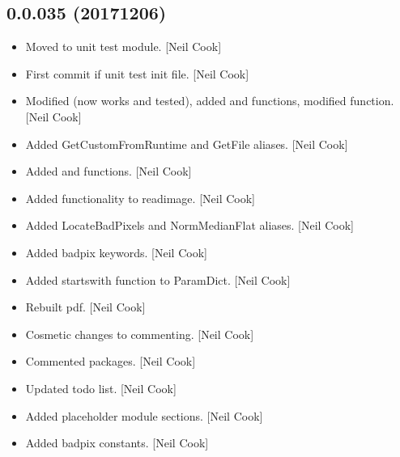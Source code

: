 \documentclass[a4paper,10pt,english]{report}
\begin{document}
\subsection{0.0.035 (2017\sphinxhyphen{}12\sphinxhyphen{}06)}
\label{\detokenize{misc/changelog:id536}}\begin{itemize}
\item {} 
Moved  to unit test module. {[}Neil Cook{]}

\item {} 
First commit if unit test init file. {[}Neil Cook{]}

\item {} 
Modified  (now works and tested), added
 and  functions, modified
 function. {[}Neil Cook{]}

\item {} 
Added GetCustomFromRuntime and GetFile aliases. {[}Neil Cook{]}

\item {} 
Added  and  functions. {[}Neil
Cook{]}

\item {} 
Added functionality to readimage. {[}Neil Cook{]}

\item {} 
Added LocateBadPixels and NormMedianFlat aliases. {[}Neil Cook{]}

\item {} 
Added badpix keywords. {[}Neil Cook{]}

\item {} 
Added startswith function to ParamDict. {[}Neil Cook{]}

\item {} 
Rebuilt pdf. {[}Neil Cook{]}

\item {} 
Cosmetic changes to commenting. {[}Neil Cook{]}

\item {} 
Commented packages. {[}Neil Cook{]}

\item {} 
Updated to\sphinxhyphen{}do list. {[}Neil Cook{]}

\item {} 
Added placeholder module sections. {[}Neil Cook{]}

\item {} 
Added badpix constants. {[}Neil Cook{]}


\end{itemize}
\end{document}

